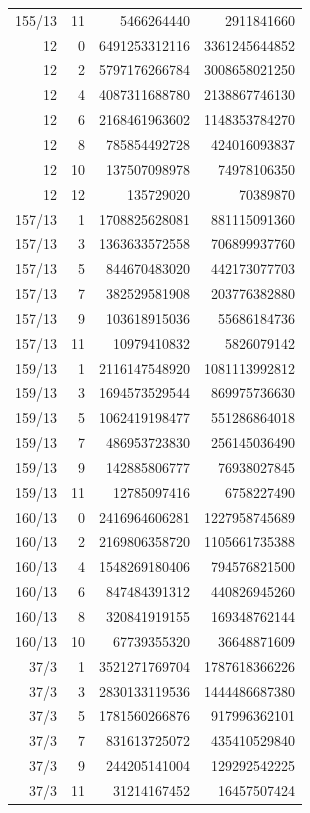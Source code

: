 \begin{longtable}{@{}rrrr@{}}
155/13 & 11 & 5466264440 & 2911841660\\
12 & 0 & 6491253312116 & 3361245644852\\
12 & 2 & 5797176266784 & 3008658021250\\
12 & 4 & 4087311688780 & 2138867746130\\
12 & 6 & 2168461963602 & 1148353784270\\
12 & 8 & 785854492728 & 424016093837\\
12 & 10 & 137507098978 & 74978106350\\
12 & 12 & 135729020 & 70389870\\
157/13 & 1 & 1708825628081 & 881115091360\\
157/13 & 3 & 1363633572558 & 706899937760\\
157/13 & 5 & 844670483020 & 442173077703\\
157/13 & 7 & 382529581908 & 203776382880\\
157/13 & 9 & 103618915036 & 55686184736\\
157/13 & 11 & 10979410832 & 5826079142\\
159/13 & 1 & 2116147548920 & 1081113992812\\
159/13 & 3 & 1694573529544 & 869975736630\\
159/13 & 5 & 1062419198477 & 551286864018\\
159/13 & 7 & 486953723830 & 256145036490\\
159/13 & 9 & 142885806777 & 76938027845\\
159/13 & 11 & 12785097416 & 6758227490\\
160/13 & 0 & 2416964606281 & 1227958745689\\
160/13 & 2 & 2169806358720 & 1105661735388\\
160/13 & 4 & 1548269180406 & 794576821500\\
160/13 & 6 & 847484391312 & 440826945260\\
160/13 & 8 & 320841919155 & 169348762144\\
160/13 & 10 & 67739355320 & 36648871609\\
37/3 & 1 & 3521271769704 & 1787618366226\\
37/3 & 3 & 2830133119536 & 1444486687380\\
37/3 & 5 & 1781560266876 & 917996362101\\
37/3 & 7 & 831613725072 & 435410529840\\
37/3 & 9 & 244205141004 & 129292542225\\
37/3 & 11 & 31214167452 & 16457507424\\

\end{longtable}
